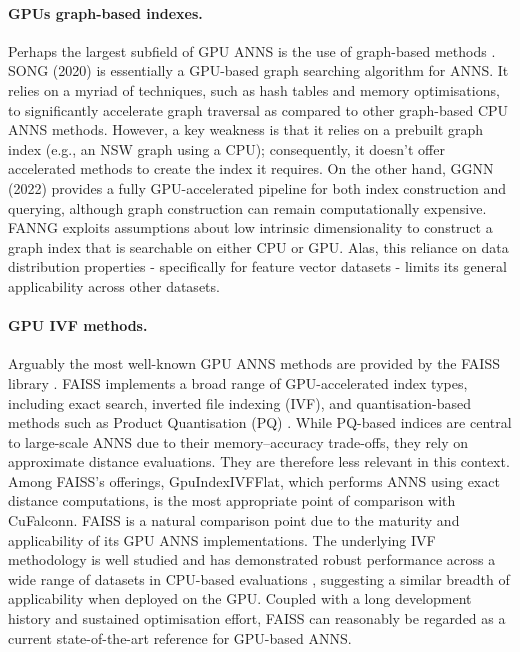 \documentclass{article}
\newcommand{\cf}{CuFalconn\xspace}
\begin{document}
\paragraph{GPUs graph-based indexes.}
Perhaps the largest subfield of GPU ANNS is the use of graph-based methods \cite{groh2022ggnn,zhao2020song,harwood2016fanng,sun2022out,yu2022gpu,ootomo2024cagra,li2025scalable}. SONG (2020) \cite{zhao2020song} is essentially a GPU-based graph searching algorithm for ANNS. It relies on a myriad of techniques, such as hash tables and memory optimisations, to significantly accelerate graph traversal as compared to other graph-based CPU ANNS methods. However, a key weakness is that it relies on a prebuilt graph index (e.g., an NSW graph \cite{malkov2014approximate} using a CPU); consequently, it doesn't offer accelerated methods to create the index it requires. On the other hand, GGNN (2022) \cite{groh2022ggnn} provides a fully GPU-accelerated pipeline for both index construction and querying, although graph construction can remain computationally expensive. FANNG \cite{harwood2016fanng} exploits assumptions about low intrinsic dimensionality to construct a graph index that is searchable on either CPU or GPU. Alas, this reliance on data distribution properties - specifically for feature vector datasets - limits its general applicability across other datasets.

\paragraph{GPU IVF methods.}

Arguably the most well-known GPU ANNS methods are provided by the FAISS library \cite{douze2025faiss}. FAISS implements a broad range of GPU-accelerated index types, including exact search, inverted file indexing (IVF), and quantisation-based methods such as Product Quantisation (PQ) \cite{kim1999quantization}. While PQ-based indices are central to large-scale ANNS due to their memory–accuracy trade-offs, they rely on approximate distance evaluations. They are therefore less relevant in this context. Among FAISS’s offerings, GpuIndexIVFFlat, which performs ANNS using exact distance computations, is the most appropriate point of comparison with \cf. FAISS is a natural comparison point due to the maturity and applicability of its GPU ANNS implementations. The underlying IVF methodology is well studied and has demonstrated robust performance across a wide range of datasets in CPU-based evaluations \cite{aumuller2020ann, jaasaari2025vibe}, suggesting a similar breadth of applicability when deployed on the GPU. Coupled with a long development history and sustained optimisation effort, FAISS can reasonably be regarded as a current state-of-the-art reference for GPU-based ANNS.
\end{document}
